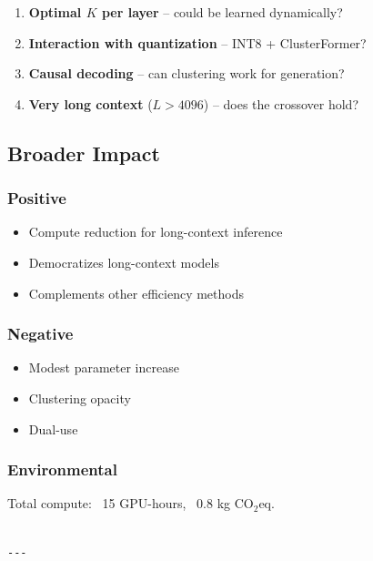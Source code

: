 \begin{enumerate}
\item \textbf{Optimal $K$ per layer} -- could be learned dynamically?
\item \textbf{Interaction with quantization} -- INT8 + ClusterFormer?
\item \textbf{Causal decoding} -- can clustering work for generation?
\item \textbf{Very long context} ($L > 4096$) -- does the crossover hold?

\end{enumerate}
\subsection{Broader Impact}

\subsubsection{Positive}
\begin{itemize}
\item Compute reduction for long-context inference
\item Democratizes long-context models
\item Complements other efficiency methods

\end{itemize}
\subsubsection{Negative}
\begin{itemize}
\item Modest parameter increase
\item Clustering opacity
\item Dual-use

\end{itemize}
\subsubsection{Environmental}
Total compute: ~15 GPU-hours, ~0.8 kg CO$_2$eq.
\begin{lstlisting}

---
\end{lstlisting}
